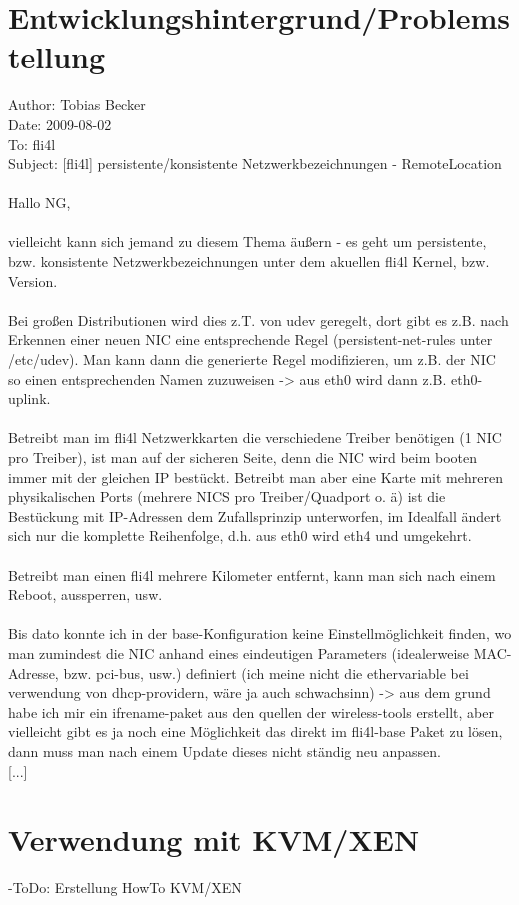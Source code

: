 

\section {Entwicklungshintergrund/Problemstellung}

Author: Tobias Becker\\
Date: 2009-08-02\\
To: fli4l\\
Subject: [fli4l] persistente/konsistente Netzwerkbezeichnungen - RemoteLocation\\
\\
Hallo NG,\\
\\
vielleicht kann sich jemand zu diesem Thema äußern - es geht um persistente, bzw. konsistente Netzwerkbezeichnungen unter dem akuellen fli4l Kernel, bzw.
Version.\\
\\
Bei großen Distributionen wird dies z.T. von udev geregelt, dort gibt es z.B. nach Erkennen einer neuen NIC eine entsprechende Regel (persistent-net-rules
unter /etc/udev). Man kann dann die generierte Regel modifizieren, um z.B. der NIC so einen entsprechenden Namen zuzuweisen -> aus eth0 wird dann z.B. eth0-uplink.\\
\\
Betreibt man im fli4l Netzwerkkarten die verschiedene Treiber benötigen (1 NIC pro Treiber), ist man auf der sicheren Seite, denn die NIC wird beim booten immer mit der gleichen IP bestückt. Betreibt man aber eine Karte mit mehreren physikalischen Ports (mehrere NICS pro Treiber/Quadport o. ä) ist die Bestückung mit IP-Adressen dem Zufallsprinzip unterworfen, im Idealfall ändert sich nur die komplette Reihenfolge, d.h. aus eth0 wird eth4 und umgekehrt.\\
\\
Betreibt man einen fli4l mehrere Kilometer entfernt, kann man sich nach einem Reboot, aussperren, usw.\\
\\
Bis dato konnte ich in der base-Konfiguration keine Einstellmöglichkeit finden, wo man zumindest die NIC anhand eines eindeutigen Parameters (idealerweise MAC-Adresse,
bzw. pci-bus, usw.) definiert (ich meine nicht die ethervariable bei verwendung von dhcp-providern, wäre ja auch schwachsinn) -> aus dem grund habe ich mir ein ifrename-paket aus den quellen der wireless-tools erstellt, aber vielleicht gibt es ja noch eine Möglichkeit das direkt im fli4l-base Paket zu lösen, dann muss man nach einem Update dieses nicht ständig neu anpassen.\\

[...]


\section {Verwendung mit KVM/XEN}
	-ToDo: Erstellung HowTo KVM/XEN 



